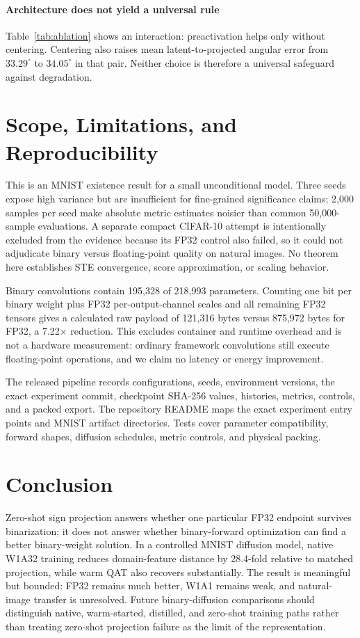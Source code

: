 \documentclass[conference]{IEEEtran}
\begin{document}
\paragraph{Architecture does not yield a universal rule}
Table~\ref{tab:ablation} shows an interaction: preactivation helps only without
centering. Centering also raises mean latent-to-projected angular error from
$33.29^\circ$ to $34.05^\circ$ in that pair. Neither choice is therefore a
universal safeguard against degradation.

\section{Scope, Limitations, and Reproducibility}

This is an MNIST existence result for a small unconditional model. Three seeds
expose high variance but are insufficient for fine-grained significance claims;
2,000 samples per seed make absolute metric estimates noisier than common
50,000-sample evaluations. A separate compact CIFAR-10 attempt is intentionally
excluded from the evidence because its FP32 control also failed, so it could not
adjudicate binary versus floating-point quality on natural images. No theorem
here establishes STE convergence, score approximation, or scaling behavior.

Binary convolutions contain 195,328 of 218,993 parameters. Counting one bit per
binary weight plus FP32 per-output-channel scales and all remaining FP32 tensors
gives a calculated raw payload of 121,316 bytes versus 875,972 bytes for FP32, a
7.22$\times$ reduction. This excludes container and runtime overhead and is not
a hardware measurement: ordinary framework convolutions still execute
floating-point operations, and we claim no latency or energy improvement.

The released pipeline\cite{monodiffuseRepo} records configurations, seeds,
environment versions, the exact experiment commit, checkpoint SHA-256 values,
histories, metrics, controls, and a packed export. The repository README maps
the exact experiment entry points and MNIST artifact directories. Tests cover
parameter compatibility, forward shapes, diffusion schedules, metric controls,
and physical packing.

\section{Conclusion}

Zero-shot sign projection answers whether one particular FP32 endpoint survives
binarization; it does not answer whether binary-forward optimization can find a
better binary-weight solution. In a controlled MNIST diffusion model, native
W1A32 training reduces domain-feature distance by 28.4-fold relative to matched
projection, while warm QAT also recovers substantially. The result is meaningful but
bounded: FP32 remains much better, W1A1 remains weak, and natural-image transfer
is unresolved. Future binary-diffusion comparisons should distinguish native,
warm-started, distilled, and zero-shot training paths rather than treating
zero-shot projection failure as the limit of the representation.
\end{document}
